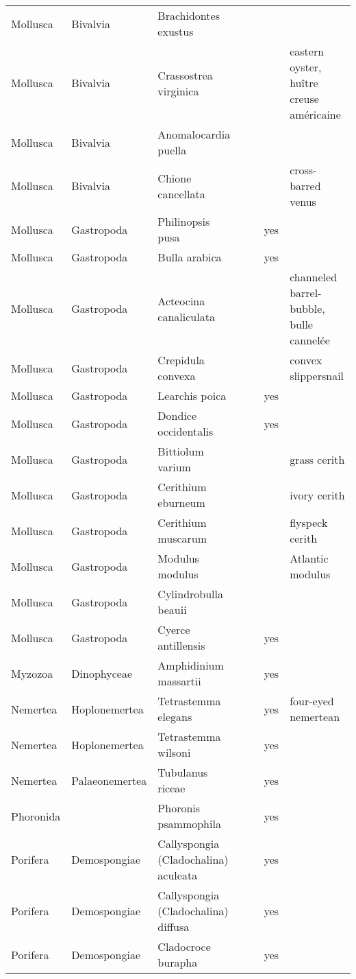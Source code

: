 \begin{longtable}{lllllll}
  Mollusca & Bivalvia & Brachidontes exustus &  &  &  &  \\ 
  Mollusca & Bivalvia & Crassostrea virginica &  &  &  & eastern oyster, huître creuse américaine \\ 
  Mollusca & Bivalvia & Anomalocardia puella &  &  &  &  \\ 
  Mollusca & Bivalvia & Chione cancellata &  &  &  & cross-barred venus \\ 
  Mollusca & Gastropoda & Philinopsis pusa &  &  & yes &  \\ 
  Mollusca & Gastropoda & Bulla arabica &  &  & yes &  \\ 
  Mollusca & Gastropoda & Acteocina canaliculata &  &  &  & channeled barrel-bubble, bulle cannelée \\ 
  Mollusca & Gastropoda & Crepidula convexa &  &  &  & convex slippersnail \\ 
  Mollusca & Gastropoda & Learchis poica &  &  & yes &  \\ 
  Mollusca & Gastropoda & Dondice occidentalis &  &  & yes &  \\ 
  Mollusca & Gastropoda & Bittiolum varium &  &  &  & grass cerith \\ 
  Mollusca & Gastropoda & Cerithium eburneum &  &  &  & ivory cerith \\ 
  Mollusca & Gastropoda & Cerithium muscarum &  &  &  & flyspeck cerith \\ 
  Mollusca & Gastropoda & Modulus modulus &  &  &  & Atlantic modulus \\ 
  Mollusca & Gastropoda & Cylindrobulla beauii &  &  &  &  \\ 
  Mollusca & Gastropoda & Cyerce antillensis &  &  & yes &  \\ 
  Myzozoa & Dinophyceae & Amphidinium massartii &  &  & yes &  \\ 
  Nemertea & Hoplonemertea & Tetrastemma elegans &  &  & yes & four-eyed nemertean \\ 
  Nemertea & Hoplonemertea & Tetrastemma wilsoni &  &  & yes &  \\ 
  Nemertea & Palaeonemertea & Tubulanus riceae &  &  & yes &  \\ 
  Phoronida &  & Phoronis psammophila &  &  & yes &  \\ 
  Porifera & Demospongiae & Callyspongia (Cladochalina) aculeata &  &  & yes &  \\ 
  Porifera & Demospongiae & Callyspongia (Cladochalina) diffusa &  &  & yes &  \\ 
  Porifera & Demospongiae & Cladocroce burapha &  &  & yes &  \\ 

\end{longtable}
